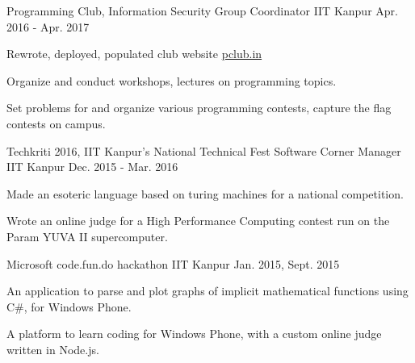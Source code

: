 \vspace{-0.3cm}


\begin{cventries}

  \extraentry
  {Programming Club, Information Security Group}
  {Coordinator}
  {IIT Kanpur}
  {Apr. 2016 - Apr. 2017}
  {
    \begin{cvitems}
    \item Rewrote, deployed, populated club website \href{http://pclub.in}{pclub.in}
    \item Organize and conduct workshops, lectures on programming topics.
    \item Set problems for and organize various programming contests,
      capture the flag contests on campus.
    \end{cvitems}
  }

  \extraentry
  {Techkriti 2016, IIT Kanpur's National Technical Fest}
  {Software Corner Manager}
  {IIT Kanpur}
  {Dec. 2015 - Mar. 2016}
  {
    \begin{cvitems}
    \item Made an esoteric language based on turing machines for a
      national competition.
    \item Wrote an online judge for a High Performance Computing
      contest run on the Param YUVA II supercomputer.
    \end{cvitems}
  }

  {Microsoft code.fun.do hackathon}
  {IIT Kanpur}
  {Jan. 2015, Sept. 2015}
  {
    \begin{cvitems}
    \item An application to parse and plot graphs of implicit
      mathematical functions using C\#, for Windows Phone.
    \item A platform to learn coding for Windows Phone, with a
      custom online judge written in Node.js.
    \end{cvitems}
  }

\end{cventries}

